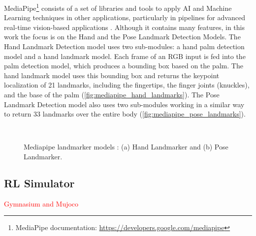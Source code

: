 MediaPipe\footnote{MediaPipe documentation: \url{https://developers.google.com/mediapipe}} consists of a set of libraries and tools to apply AI and Machine Learning techniques in other applications, particularly in pipelines for advanced real-time vision-based applications \cite{Lugaresi2019}. Although it contains many features, in this work the focus is on the Hand and the Pose Landmark Detection Models.
The Hand Landmark Detection model \cite{Zhang2020} uses two sub-modules: a hand palm detection model and a hand landmark model. Each frame of an RGB input is fed into the palm detection model, which produces a bounding box based on the palm. The hand landmark model uses this bounding box and returns the keypoint localization of 21 landmarks, including the fingertips, the finger joints (knuckles), and the base of the palm (\autoref{fig:mediapipe_hand_landmarks}). The Pose Landmark Detection model also uses two sub-modules working in a similar way to return 33 landmarks over the entire body (\autoref{fig:mediapipe_pose_landmarks}).

\begin{figure}[ht]
    \centering
    \begin{subfigure}[b]{0.49\textwidth}
        \caption{}
        \label{fig:mediapipe_hand_landmarks}
    \end{subfigure} \
    \begin{subfigure}[b]{0.49\textwidth}
        \caption{}
        \label{fig:mediapipe_pose_landmarks}
    \end{subfigure}
    \caption[Mediapipe landmarker models: Hand Landmarker and Pose Landmarker.]{Mediapipe landmarker models \cite{mediapipe_docs}: (a) Hand Landmarker and (b) Pose Landmarker.}
    \label{fig:mediapipe_landmarks}
\end{figure}

\subsection{RL Simulator}



\textcolor{red}{Gymnasium and Mujoco}